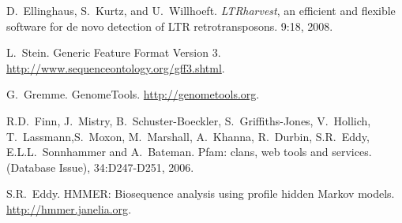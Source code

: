 \documentclass[12pt,titlepage]{article}
\begin{document}

\begin{thebibliography}{1}

D.~Ellinghaus, S.~Kurtz, and U.~Willhoeft.
\newblock \emph{LTRharvest}, an efficient and flexible software for de novo
  detection of \normalsize{LTR} retrotransposons.
 9:18, 2008.

L.~Stein.
\newblock Generic Feature Format Version 3.
  \url{http://www.sequenceontology.org/gff3.shtml}.

G.~Gremme.
\newblock GenomeTools.
  \url{http://genometools.org}.

R.D.~Finn, J.~Mistry, B.~Schuster-Boeckler, S.~Griffiths-Jones, V.~Hollich, T.~Lassmann,S.~Moxon, M.~Marshall, A.~Khanna, R.~Durbin, S.R.~Eddy, E.L.L.~Sonnhammer and A.~Bateman.
\newblock  Pfam: clans, web tools and services.
 (Database Issue), 34:D247-D251, 2006.

S.R.~Eddy.
\newblock HMMER: Biosequence analysis using profile hidden Markov models.
  \url{http://hmmer.janelia.org}.


\end{thebibliography}
\end{document}
